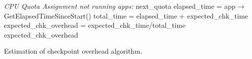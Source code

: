 \begin{algorithm}
    \DontPrintSemicolon
    \BlankLine
    \algrule
   \nonl\emph{CPU Quota Assignment not running apps:}\;
   {
  \BlankLine
        {\KwRet next\_quota}
        elapsed\_time = app$\rightarrow$GetElapsedTimeSinceStart()\;
        total\_time = elapsed\_time + expected\_chk\_time\;
        expected\_chk\_overhead = expected\_chk\_time/total\_time\;}
        \BlankLine
        \KwRet expected\_chk\_overhead\;
    \BlankLine
   \caption{Estimation of checkpoint overhead algorithm.}
   \label{alg:notrun}
\end{algorithm}